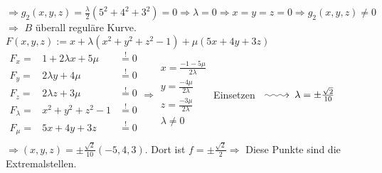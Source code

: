 \documentclass[12pt,a4paper,titlepage]{article}
\makeatletter
\newcommand{\longsquiggly}{\xymatrix{{}\ar@{~>}[r]&{}}}
\makeatother
\begin{document}
$\Rightarrow g_2(x,y,z)=\frac{\lambda}{2}(5^2+4^2+3^2)=0 \Rightarrow \lambda=0 \Rightarrow x=y=z=0 \Rightarrow g_2(x,y,z)\neq 0$ \\
$\Rightarrow$ $B$ überall reguläre Kurve. \\
$F(x,y,z):=x+\lambda(x^2+y^2+z^2-1)+\mu(5x+4y+3z)$ \\
$\begin{array}{lll}
  F_x= & 1+2\lambda x+5\mu & \overset{!}{=}0 \\
  F_y= & 2\lambda y+4\mu & \overset{!}{=}0 \\
  F_z= & 2\lambda z+3\mu & \overset{!}{=}0 \\
  F_\lambda= & x^2+y^2+z^2-1 & \overset{!}{=}0 \\
  F_\mu= & 5x+4y+3z & \overset{!}{=}0 \\
\end{array} \Rightarrow \begin{array}{l}
  x=\frac{-1-5\mu}{2\lambda} \\
  y=\frac{-4\mu}{2\lambda} \\
  z=\frac{-3\mu}{2\lambda} \\
  \lambda\neq 0 \\
  \quad
\end{array}$ Einsetzen $\longsquiggly \lambda=\pm\frac{\sqrt{2}}{10} $ \\
$\Rightarrow (x,y,z)=\pm\frac{\sqrt{2}}{10}(-5,4,3)$. Dort ist $f=\pm\frac{\sqrt{2}}{2} \Rightarrow$ Diese Punkte sind die Extremalstellen.
\end{document}

